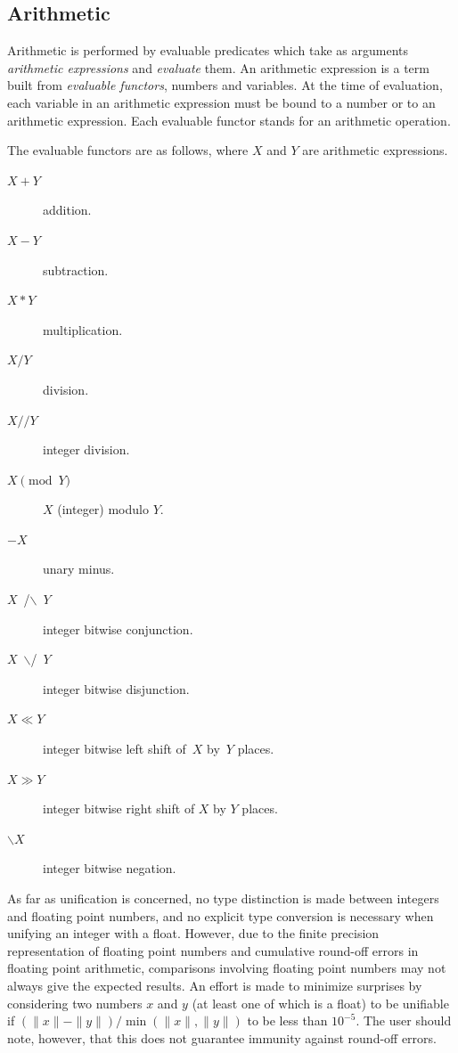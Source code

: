 \subsection{Arithmetic}\label{arithmetic}
Arithmetic is performed by evaluable predicates which take as arguments
{\em arithmetic expressions} and {\em evaluate} them.
An arithmetic expression is a term built from {\em evaluable functors},
numbers and variables.
At the time of evaluation, each variable in an arithmetic
expression must be bound to a number or to an arithmetic expression.
Each evaluable functor stands for an arithmetic operation.

The evaluable functors are as follows,
where $X$ and $Y$ are arithmetic expressions.

\begin{description}
\item[$X+Y$] addition.

\item[$X-Y$] subtraction.

\item[$X*Y$] multiplication.

\item[$X/Y$] division.

\item[$X//Y$] integer division.

\item[$X\pmod Y$] $X$ (integer) modulo $Y$.

\item[$-X$] unary minus.

\item[$X$\ /$\backslash$\ $Y$] integer bitwise conjunction.

\item[$X$\ $\backslash$/\ $Y$] integer bitwise disjunction.

\item[$X\ll Y$] integer bitwise left shift of~$X$ by~$Y$ places.

\item[$X\gg Y$] integer bitwise right shift of $X$ by $Y$ places.

\item[$\backslash X$] integer bitwise negation.
\end{description}

As far as unification is concerned, no type distinction is made between
integers and floating point numbers,
and no explicit type conversion is necessary
when unifying an integer with a float.
However, due to the finite precision representation of floating point numbers
and cumulative round-off errors in floating point arithmetic,
comparisons involving floating point numbers may
not always give the expected results.
An effort is made to minimize surprises by considering two numbers
$x$ and $y$ (at least one of which is a float)
to be unifiable if $(\|x\|-\|y\|)/\min(\|x\|,\|y\|)$
to be less than $10^{-5}$.
The user should note, however, that this does
not guarantee immunity against round-off errors.

